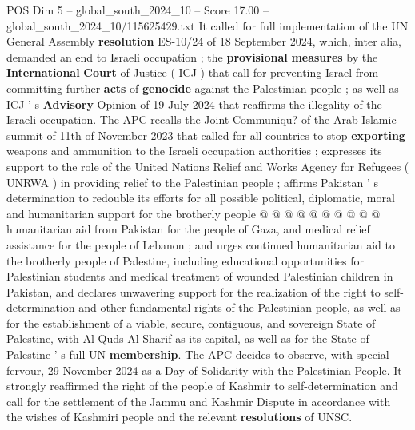 \begin{textsample}{POS Dim 5 – global\_south\_2024\_10 – Score 17.00 – global\_south\_2024\_10/115625429.txt}
It called for full implementation of the UN General Assembly \textbf{resolution} ES-10/24 of 18 September 2024, which, inter alia, demanded an end to Israeli occupation ; the \textbf{provisional} \textbf{measures} by the \textbf{International} \textbf{Court} of Justice ( ICJ ) that call for preventing Israel from committing further \textbf{acts} of \textbf{genocide} against the Palestinian people ; as well as ICJ ' s \textbf{Advisory} Opinion of 19 July 2024 that reaffirms the illegality of the Israeli occupation.
The APC recalls the Joint Communiqu? of the Arab-Islamic summit of 11th of November 2023 that called for all countries to stop \textbf{exporting} weapons and ammunition to the Israeli occupation authorities ; expresses its support to the role of the United Nations Relief and Works Agency for Refugees ( UNRWA ) in providing relief to the Palestinian people ; affirms Pakistan ' s determination to redouble its efforts for all possible political, diplomatic, moral and humanitarian support for the brotherly people @ @ @ @ @ @ @ @ @ @ humanitarian aid from Pakistan for the people of Gaza, and medical relief assistance for the people of Lebanon ; and urges continued humanitarian aid to the brotherly people of Palestine, including educational opportunities for Palestinian students and medical treatment of wounded Palestinian children in Pakistan, and declares unwavering support for the realization of the right to self-determination and other fundamental rights of the Palestinian people, as well as for the establishment of a viable, secure, contiguous, and sovereign State of Palestine, with Al-Quds Al-Sharif as its capital, as well as for the State of Palestine ' s full UN \textbf{membership}.
The APC decides to observe, with special fervour, 29 November 2024 as a Day of Solidarity with the Palestinian People.
It strongly reaffirmed the right of the people of Kashmir to self-determination and call for the settlement of the Jammu and Kashmir Dispute in accordance with the wishes of Kashmiri people and the relevant \textbf{resolutions} of UNSC.

\end{textsample}
